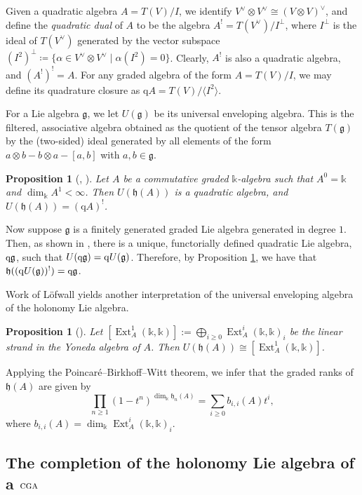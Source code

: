 \documentclass{article}
\numberwithin{equation}{section}
\newtheorem{proposition}[theorem]{Proposition}
\theoremstyle{definition}
\renewcommand{\k}{\mathbb{k}}
\newcommand{\g}{{\mathfrak{g}}}
\newcommand{\h}{{\mathfrak{h}}}
\newcommand{\cga}{\ensuremath{\textsc{cga}}}
\DeclareMathOperator{\Ext}{{Ext}}
\newcommand{\qA}{\mathrm{q}A}
\newcommand{\qg}{{\mbox{\rm{\small{q}}}}\g}
\newcommand{\q}{\mathrm{q}}
\begin{document}
Given a quadratic algebra $A=T(V)/I$, we identify 
$V^{\vee}\otimes V^{\vee} \cong (V\otimes V)^{\vee}$, and 
define the {\em quadratic dual}\/ of $A$ to be the algebra 
$A^{!}=T(V^{\vee})/I^{\perp}$,
where $I^{\perp}$ is the ideal of $T(V^{\vee})$ 
generated by the vector subspace $(I^2)^{\perp}\coloneqq 
\{\alpha\in V^{\vee}\otimes V^{\vee} \mid \alpha(I^2)=0\}$. 
Clearly, $A^{!}$ is also a quadratic algebra, and $(A^{!})^{!}=A$.    
For any graded algebra of the form $A=T(V)/I$, we may 
define its quadrature closure as $\qA=T(V)/\langle I^2\rangle$. 

For a Lie algebra $\g$, we let $U(\g)$ be its universal enveloping 
algebra. This is the filtered, associative algebra obtained as the 
quotient of the tensor algebra $T(\g)$ by the (two-sided) ideal 
generated by all elements of the form 
$a\otimes b-b\otimes a-[a,b]$ with $a, b\in \g$. 

\begin{proposition}[\cite{PY99}, \cite{SW-forum}]
\label{prop:Papadima-Y}
Let $A$ be a commutative graded $\k$-algebra such that $A^0=\k$ 
and $\dim_{\k} A^1<\infty$. Then $U(\h(A))$ is a quadratic algebra, 
and $U(\h(A))=(\qA)^!$.
\end{proposition}

Now suppose $\g$ is a finitely generated graded Lie algebra generated 
in degree $1$. Then, as shown in \cite{SW-forum}, there is a unique, 
functorially defined quadratic Lie algebra, $\qg$, such that $U(\qg) = \q U(\g)$. 
Therefore, by Proposition \ref{prop:Papadima-Y}, we have that 
$\h((\q U(\g))^{!})=\qg$.

Work of L\"{o}fwall \cite{Lofwall} yields another interpretation of the 
universal enveloping algebra of the holonomy Lie algebra.  

\begin{proposition}[\cite{Lofwall}]
\label{prop:yoneda}
Let $[\Ext^1_A(\k,\k)]:=\bigoplus_{i\ge 0} \Ext^i_A(\k,\k)_i$ be the linear strand 
in the Yoneda algebra of $A$.  Then $U(\h(A))\cong [\Ext^1_A(\k,\k)]$. 
\end{proposition}

Applying the Poincar\'{e}--Birkhoff--Witt theorem, we infer that the 
graded ranks of  $\h(A)$ are given by 
\begin{equation}
\label{eq:pbw}
\prod_{n\geq 1}(1-t^n)^{\dim_{\k} \h_n(A)} = \sum_{i\ge 0} b_{i,i}(A) t^i,
\end{equation}
where $b_{i,i}(A)=\dim_{\k} \Ext^i_A(\k,\k)_i$.

\subsection{The completion of the holonomy Lie algebra of a $\cga$}
\label{subsec:holohat}
\end{document}
